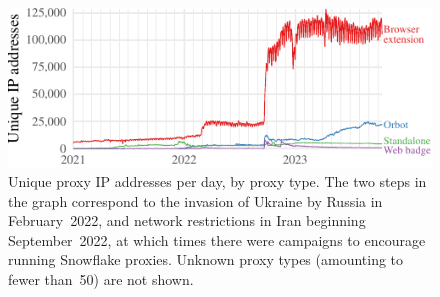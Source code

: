 \documentclass[letterpaper,twocolumn]{article}
\begin{document}
\begin{figure}
\includegraphics{figures/proxies/proxy-type}
\caption{
Unique proxy IP addresses per day,
by proxy type.
The two steps in the graph correspond
to the invasion of Ukraine by Russia in February~2022,
and network restrictions in Iran beginning September~2022,
at which times there were campaigns
to encourage running Snowflake proxies.
Unknown proxy types (amounting to fewer than~50) are not shown.
}
\label{fig:proxy-type}
\end{figure}
\end{document}
